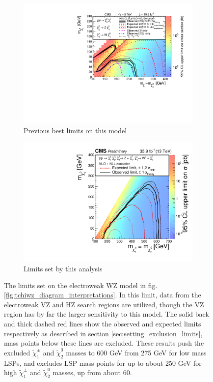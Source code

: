     \begin{figure}[!h]
      \centering
        \begin{subfigure}[b]{0.4\textwidth}
          \label{fig:t5zz_interpretations_2015}
          \includegraphics[width=\textwidth]{figures/interpretations/TChiWZ_previous_best.pdf}
          \caption{Previous best limits on this model}
        \end{subfigure}
        \begin{subfigure}[b]{0.4\textwidth}
          \label{fig:t5zz_interpretations_current}
          \includegraphics[width=\textwidth]{figures/interpretations/TChiWZ_Exclusion_13TeV.pdf}
          \caption{Limits set by this analysis}
        \end{subfigure}
      \caption{ \label{fig:tchiwz_interpretation}
        The limits set on the electroweak WZ model in fig. \ref{fig:tchiwz_diagram_interpretations}. In this limit, data from the electroweak VZ and HZ search regions are utilized, though the VZ region has by far the larger sensitivity to this model. The solid back and thick dashed red lines show the observed and expected limits respectively as described in section \ref{sec:setting_exclusion_limits}, mass points below these lines are excluded. These results push the excluded $\widetilde{\chi}^{\pm}_1$ and $\widetilde{\chi}^0_2$ masses to 600 GeV from 275 GeV for low mass LSPs, and excludes LSP mass points for up to about 250 GeV for high $\widetilde{\chi}^{\pm}_1$ and $\widetilde{\chi}^0_2$ masses, up from about 60.
}
\end{figure}
